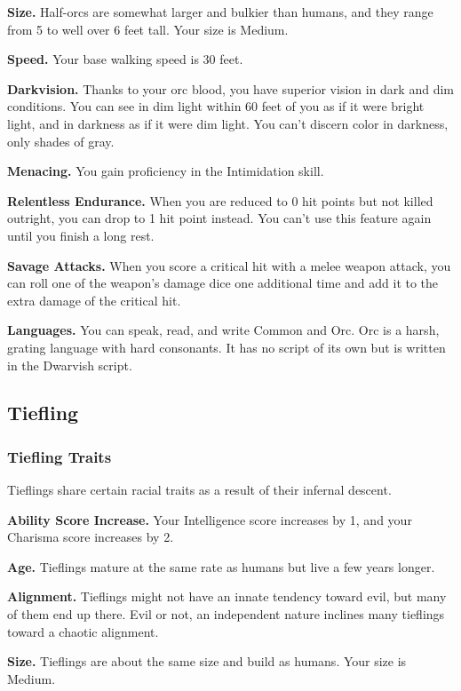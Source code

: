 \documentclass[
]{article}
\begin{document}
\textbf{Size.} Half-orcs are somewhat larger and bulkier than humans,
and they range from 5 to well over 6 feet tall. Your size is Medium.

\textbf{Speed.} Your base walking speed is 30 feet.

\textbf{Darkvision.} Thanks to your orc blood, you have superior vision
in dark and dim conditions. You can see in dim light within 60 feet of
you as if it were bright light, and in darkness as if it were dim light.
You can't discern color in darkness, only shades of gray.

\textbf{Menacing.} You gain proficiency in the Intimidation skill.

\textbf{Relentless Endurance.} When you are reduced to 0 hit points but
not killed outright, you can drop to 1 hit point instead. You can't use
this feature again until you finish a long rest.

\textbf{Savage Attacks.} When you score a critical hit with a melee
weapon attack, you can roll one of the weapon's damage dice one
additional time and add it to the extra damage of the critical hit.

\textbf{Languages.} You can speak, read, and write Common and Orc. Orc
is a harsh, grating language with hard consonants. It has no script of
its own but is written in the Dwarvish script.

\hypertarget{tiefling}{%
\subsection{Tiefling}\label{tiefling}}

\hypertarget{tiefling-traits}{%
\subsubsection{Tiefling Traits}\label{tiefling-traits}}

Tieflings share certain racial traits as a result of their infernal
descent.

\textbf{Ability Score Increase.} Your Intelligence score increases by 1,
and your Charisma score increases by 2.

\textbf{Age.} Tieflings mature at the same rate as humans but live a few
years longer.

\textbf{Alignment.} Tieflings might not have an innate tendency toward
evil, but many of them end up there. Evil or not, an independent nature
inclines many tieflings toward a chaotic alignment.

\textbf{Size.} Tieflings are about the same size and build as humans.
Your size is Medium.
\end{document}
